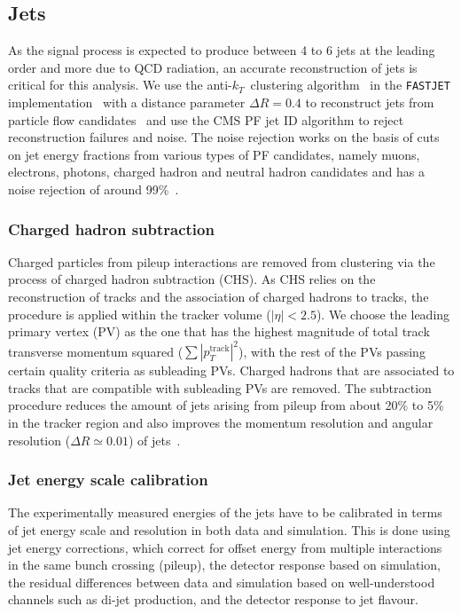 \subsection{Jets}
\label{sec:object_id_jets}
As the signal process is expected to produce between 4 to 6 jets at the leading order and more due to QCD radiation, an accurate reconstruction of jets is critical for this analysis. We use the anti-$k_T$~clustering algorithm~\cite{Cacciari:2008gp} in the \texttt{FASTJET} implementation~\cite{Cacciari:2011ma} with a distance parameter $\Delta R=0.4$ to reconstruct jets from particle flow candidates~\cite{CMS:2010xta,CMS:2009nxa,CMS:2010byl} and use the CMS PF jet ID algorithm to reject reconstruction failures and noise. The noise rejection works on the basis of cuts on jet energy fractions from various types of PF candidates, namely muons, electrons, photons, charged hadron and neutral hadron candidates and has a noise rejection of around 99\%~\cite{CMS:2017wyc}.

\subsubsection{Charged hadron subtraction}
Charged particles from pileup interactions are removed from clustering via the process of charged hadron subtraction (CHS). As CHS relies on the reconstruction of tracks and the association of charged hadrons to tracks, the procedure is applied within the tracker volume ($|\eta| < 2.5$). We choose the leading primary vertex (PV) as the one that has the highest magnitude of total track transverse momentum squared ($\sum |p_T^{\mathrm{track}}|^2$), with the rest of the PVs passing certain quality criteria as subleading PVs. Charged hadrons that are associated to tracks that are compatible with subleading PVs are removed. The subtraction procedure reduces the amount of jets arising from pileup from about 20\% to 5\% in the tracker region and also improves the momentum resolution and angular resolution ($\Delta R \simeq 0.01$) of jets~\cite{CMS:2014ata}.

\subsubsection{Jet energy scale calibration}
\label{sec:jes_calibration}
The experimentally measured energies of the jets have to be calibrated in terms of jet energy scale and resolution in both data and simulation. This is done using jet energy corrections, which correct for offset energy from multiple interactions in the same bunch crossing (pileup), the detector response based on simulation, the residual differences between data and simulation based on well-understood channels such as di-jet production, and the detector response to jet flavour. 

